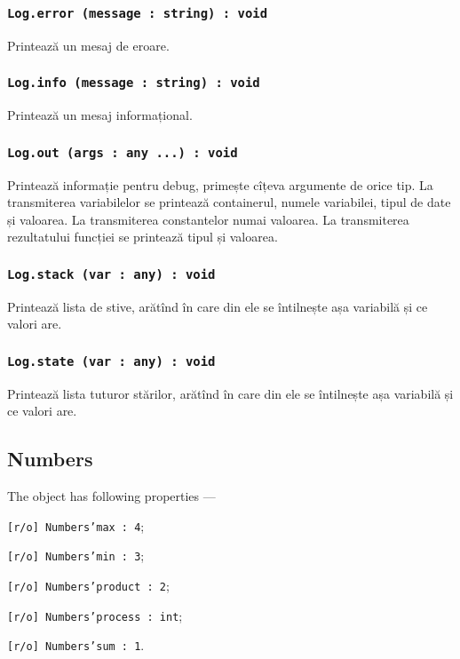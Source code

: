 \subsubsection{\texttt{Log.error (message : string) : void}}

Printează un mesaj de eroare.

\subsubsection{\texttt{Log.info (message : string) : void}}

Printează un mesaj informațional.

\subsubsection{\texttt{Log.out (args : any ...) : void}}

Printează informație pentru debug, primește cîțeva argumente de orice tip. La transmiterea variabilelor se printează containerul, numele variabilei, tipul de date și valoarea. La transmiterea constantelor numai valoarea. La transmiterea rezultatului funcției se printează tipul și valoarea.

\subsubsection{\texttt{Log.stack (var : any) : void}}

Printează lista de stive, arătînd în care din ele se întilnește așa variabilă și ce valori are.

\subsubsection{\texttt{Log.state (var : any) : void}}

Printează lista tuturor stărilor, arătînd în care din ele se întilnește așa variabilă și ce valori are.

\subsection{{\color{orange} Numbers}}

The object \numbers{} has following properties —
\begin{icItems}
	\item \texttt{[r/o] Numbers'max : 4};
	\item \texttt{[r/o] Numbers'min : 3};
	\item \texttt{[r/o] Numbers'product : 2};
	\item \texttt{[r/o] Numbers'process : int};
	\item \texttt{[r/o] Numbers'sum : 1}.
\end{icItems}

